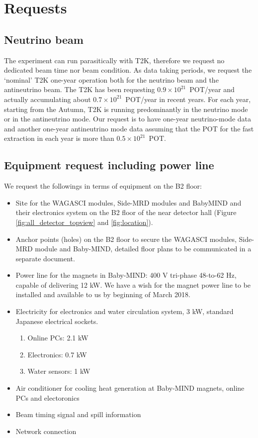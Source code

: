 \section{Requests}

\subsection{Neutrino beam}
The experiment can run parasitically with T2K, therefore we request no dedicated beam time nor beam condition.
As data taking periods, we request the `nominal' T2K one-year operation both for the neutrino beam and the antineutrino beam.
The T2K has been requesting $0.9\times10^{21}$~POT/year and actually accumulating about $0.7\times10^{21}$~POT/year in recent years.
For each year, starting from the Autumn,  T2K is running predominantly in the neutrino mode or in the antineutrino mode.
Our request is to have one-year neutrino-mode data and another one-year antineutrino mode data
assuming that the POT for the fast extraction in each year is more than $0.5\times10^{21}$~POT.

\subsection{Equipment request including power line}
We request the followings in terms of equipment on the B2 floor:
\begin{itemize}
\item {Site for the WAGASCI modules, Side-MRD modules and BabyMIND and their electronics system on the B2 floor of the near detector hall (Figure \ref{fig:all_detector_topview} and \ref{fig:location}).}
\item {Anchor points (holes) on the B2 floor to secure the WAGASCI modules, Side-MRD module and Baby-MIND, detailed floor plans to be communicated in a separate document.}
\item {Power line for the magnets in Baby-MIND: 400 V tri-phase 48-to-62 Hz, capable of delivering 12 kW. We have a wish for the magnet power line to be installed and available to us by beginning of March 2018.}
\item Electricity for electronics and water circulation system, 3 kW, standard Japanese electrical sockets.
	\begin{enumerate}
		\item Online PCs: 2.1 kW
		\item Electronics: 0.7 kW
		\item Water sensors: 1 kW
	\end{enumerate}
\item Air conditioner for cooling heat generation at Baby-MIND magnets, online PCs and electoronics
\item Beam timing signal and spill information
\item Network connection
\end{itemize}

